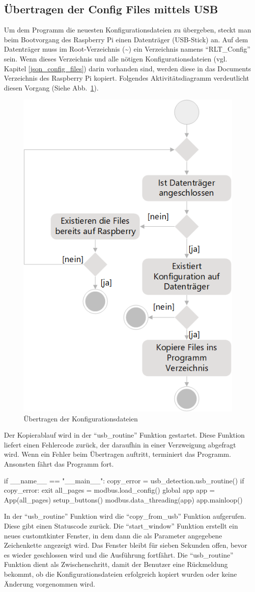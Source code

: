 \subsection{Übertragen der Config Files mittels USB}
Um dem Programm die neuesten Konfigurationsdateien zu übergeben, steckt man beim Bootvorgang des Raspberry Pi einen Datenträger (\zB USB-Stick) an. Auf dem Datenträger muss im Root-Verzeichnis (\textasciitilde) ein Verzeichnis namens \enquote{RLT\_Config} sein. Wenn dieses Verzeichnis und alle nötigen Konfigurationsdateien (vgl. Kapitel \ref{json_config_files}) darin vorhanden sind, werden diese in das Documents Verzeichnis des Raspberry Pi kopiert. Folgendes Aktivitätsdiagramm verdeutlicht diesen Vorgang (Siehe Abb.~\ref{fig:config_ubertragen_activity}).
\begin{figure}[H]
	\centering
	\includegraphics[width=0.4\linewidth]{Bilder/config_ubertragen_activity_diagram}
	\caption{Übertragen der Konfigurationsdateien}
	\label{fig:config_ubertragen_activity}
\end{figure}

Der Kopierablauf wird in der \enquote{usb\_routine} Funktion gestartet. Diese Funktion liefert einen Fehlercode zurück, der daraufhin in einer Verzweigung abgefragt wird. Wenn ein Fehler beim Übertragen auftritt, terminiert das Programm. Ansonsten fährt das Programm fort.
\begin{pythoncode}
if __name__ == "__main__":
	copy_error = usb_detection.usb_routine()
	if copy_error:
		exit
	all_pages = modbus.load_config()
	global app
	app = App(all_pages)
	setup_buttons()
	modbus.data_threading(app)
	app.mainloop()	
\end{pythoncode}

In der \enquote{usb\_routine} Funktion wird die \enquote{copy\_from\_usb} Funktion aufgerufen. Diese gibt einen Statuscode zurück. Die \enquote{start\_window} Funktion erstellt ein neues customtkinter Fenster, in dem dann die als Parameter angegebene Zeichenkette angezeigt wird. Das Fenster bleibt für sieben Sekunden offen, bevor es wieder geschlossen wird und die Ausführung fortfährt. Die \enquote{usb\_routine} Funktion dient als Zwischenschritt, damit der Benutzer eine Rückmeldung bekommt, ob die Konfigurationsdateien erfolgreich kopiert wurden oder keine Änderung vorgenommen wird.

